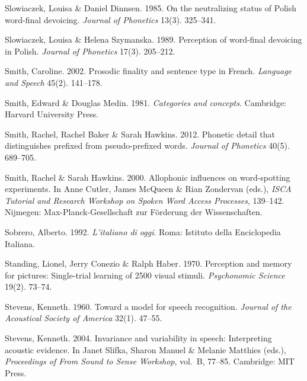 \documentclass[ number=1
,series=labphon
,output=long
,url=http://langsci-press.org/catalog/book/16
,isbn=978-3-944675-01-5
]{LSP/langsci}
\begin{document}
\begin{thebibliography}{284}
Slowiaczek, Louisa \& Daniel Dinnsen. 1985.
\newblock On the neutralizing status of {P}olish word-final devoicing.
\newblock \emph{Journal of Phonetics} 13(3). 325--341.

Slowiaczek, Louisa \& Helena Szymanska. 1989.
\newblock Perception of word-final devoicing in {P}olish.
\newblock \emph{Journal of Phonetics} 17(3). 205--212.

Smith, Caroline. 2002.
\newblock Prosodic finality and sentence type in {F}rench.
\newblock \emph{Language and Speech} 45(2). 141--178.

Smith, Edward \& Douglas Medin. 1981.
\newblock \emph{Categories and concepts}.
\newblock Cambridge: Harvard University Press.

Smith, Rachel, Rachel Baker \& Sarah Hawkins. 2012.
\newblock Phonetic detail that distinguishes prefixed from pseudo-prefixed
  words.
\newblock \emph{Journal of Phonetics} 40(5). 689--705.

Smith, Rachel \& Sarah Hawkins. 2000.
\newblock Allophonic influences on word-spotting experiments.
\newblock In Anne Cutler, James McQueen \& Rian Zondervan (eds.), \emph{{ISCA
  Tutorial and Research Workshop on Spoken Word Access Processes}}, 139--142.
  Nijmegen: Max-Planck-Gesellschaft zur Förderung der Wissenschaften.

Sobrero, Alberto. 1992.
\newblock \emph{L'italiano di oggi}.
\newblock Roma: Istituto della Enciclopedia Italiana.

Standing, Lionel, Jerry Conezio \& Ralph Haber. 1970.
\newblock Perception and memory for pictures: {S}ingle-trial learning of 2500
  visual stimuli.
\newblock \emph{Psychonomic Science} 19(2). 73--74.

Stevens, Kenneth. 1960.
\newblock Toward a model for speech recognition.
\newblock \emph{Journal of the Acoustical Society of America} 32(1). 47--55.

Stevens, Kenneth. 2004.
\newblock Invariance and variability in speech: {I}nterpreting acoustic
  evidence.
\newblock In Janet Slifka, Sharon Manuel \& Melanie Matthies (eds.),
  \emph{Proceedings of {From Sound to Sense Workshop}}, vol.~B, 77--85.
  Cambridge: MIT Press.


\end{thebibliography}
\end{document}
